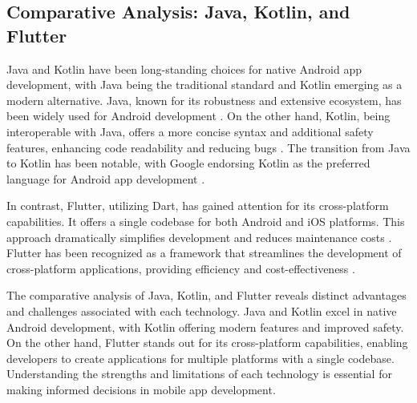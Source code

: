 \subsection{Comparative Analysis: Java, Kotlin, and Flutter }
Java and Kotlin have been long-standing choices for native Android app development, with Java being the traditional standard and Kotlin emerging as a modern alternative. Java, known for its robustness and extensive ecosystem, has been widely used for Android development \cite{wasilewski2021comparison}. On the other hand, Kotlin, being interoperable with Java, offers a more concise syntax and additional safety features, enhancing code readability and reducing bugs \cite{ardito2020effectiveness}. The transition from Java to Kotlin has been notable, with Google endorsing Kotlin as the preferred language for Android app development \cite{coppola2019characterizing}.
\par
In contrast, Flutter, utilizing Dart, has gained attention for its cross-platform capabilities. It offers a single codebase for both Android and iOS platforms. This approach dramatically simplifies development and reduces maintenance costs \cite{prasetia2023development}. Flutter has been recognized as a framework that streamlines the development of cross-platform applications, providing efficiency and cost-effectiveness \cite{Meiller_2022}.
\par
The comparative analysis of Java, Kotlin, and Flutter reveals distinct advantages and challenges associated with each technology. Java and Kotlin excel in native Android development, with Kotlin offering modern features and improved safety. On the other hand, Flutter stands out for its cross-platform capabilities, enabling developers to create applications for multiple platforms with a single codebase. Understanding the strengths and limitations of each technology is essential for making informed decisions in mobile app development.
